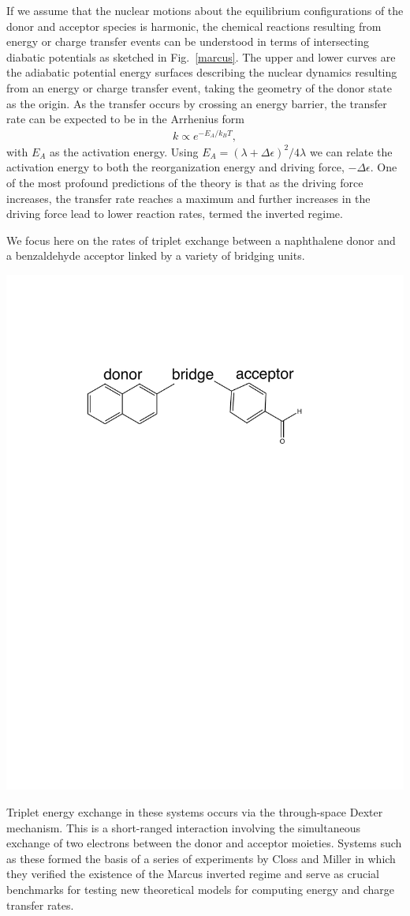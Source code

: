 If we assume that the nuclear motions about the equilibrium configurations of the
donor and acceptor species is harmonic,  the chemical reactions resulting from
energy or charge transfer events can be understood in terms of intersecting
diabatic potentials as sketched in Fig.~\ref{marcus}.    The upper and lower
curves are the adiabatic potential energy surfaces describing the nuclear dynamics
resulting from an energy or charge transfer event, taking the geometry of the donor
state as the origin.
As the transfer occurs by crossing an energy barrier,
the transfer rate can be expected to be in the Arrhenius form
\begin{eqnarray}
k\propto e^{-E_{A}/k_{B}T},
\end{eqnarray}
with $E_{A}$ as the activation energy.
 Using $E_{A}={(\lambda+\Delta \epsilon)^{2}}/{4\lambda}$
 we can relate the activation energy to both the reorganization energy and driving force, $-\Delta \epsilon$.
One of the most profound predictions of the theory is that  as the driving force increases,
the transfer rate reaches a maximum and further increases in the driving force
lead to lower reaction rates, termed the inverted regime.



We focus here on the rates of triplet exchange between a naphthalene donor and a benzaldehyde acceptor linked by a variety of bridging units.
\begin{center}
\includegraphics[width=0.50\columnwidth]{Chapters/chap2/Scheme1}
\end{center}
Triplet energy exchange in these systems occurs via the through-space Dexter mechanism\cite{dexter1953theory}.
This is a short-ranged interaction involving the simultaneous exchange of two electrons between the
donor and acceptor moieties.
Systems such as these formed the basis of a series of experiments by  Closs and Miller\cite{miller1984intramolecular}
in which they verified the existence of the Marcus inverted regime
and serve as crucial benchmarks for testing new theoretical models for computing
energy and charge transfer rates\cite{subotnik2008constructing,subotnik2009initial,subotnik2010predicting}.



